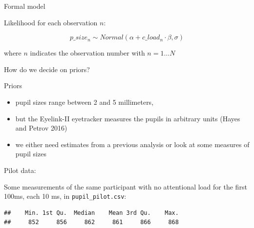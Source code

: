 \documentclass[12pt,ignorenonframetext,aspectratio=169]{beamer}
\newenvironment{Shaded}{\begin{snugshade}}{\end{snugshade}}
\newcommand{\KeywordTok}[1]{\textcolor[rgb]{0.13,0.29,0.53}{\textbf{#1}}}
\newcommand{\NormalTok}[1]{#1}
\newcommand{\OperatorTok}[1]{\textcolor[rgb]{0.81,0.36,0.00}{\textbf{#1}}}
\newcommand{\StringTok}[1]{\textcolor[rgb]{0.31,0.60,0.02}{#1}}
\providecommand{\tightlist}{%
  \setlength{\itemsep}{0pt}\setlength{\parskip}{0pt}}
\begin{document}
\begin{frame}{Formal model}
\protect\hypertarget{formal-model}{}

\begin{block}{Likelihood for each observation \(n\):}

\begin{equation}
p\_size_n \sim Normal(\alpha + c\_load_n \cdot \beta,\sigma)
\end{equation}

where \(n\) indicates the observation number with \(n = 1 \ldots N\)

\end{block}

\begin{block}{How do we decide on priors?}

\end{block}

\end{frame}

\begin{frame}{Priors}
\protect\hypertarget{priors}{}

\begin{itemize}
\tightlist
\item
  pupil sizes range between 2 and 5 millimeters,
\item
  but the Eyelink-II eyetracker measures the pupils in arbitrary units (Hayes and Petrov 2016)
\item
  we either need estimates from a previous analysis or look at some measures of pupil sizes
\end{itemize}

\end{frame}

\begin{frame}[fragile]

\begin{block}{Pilot data:}

Some measurements of the same participant with no attentional load for the first 100ms, each 10 ms, in \texttt{pupil\_pilot.csv}:

\small

\begin{Shaded}
\end{Shaded}

\begin{verbatim}
##    Min. 1st Qu.  Median    Mean 3rd Qu.    Max. 
##     852     856     862     861     866     868
\end{verbatim}

\normalsize

\end{block}

\end{frame}
\end{document}
